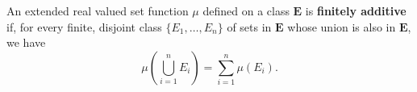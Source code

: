 An extended real valued set function $\mu$ defined on a class $\mathbf{E}$ is \textbf{finitely additive} if, for every finite, disjoint class $\{E_1, \dots, E_n\}$ of sets in $\mathbf{E}$ whose union is also in $\mathbf{E}$, we have
$$\mu\left(\bigcup_{i=1}^{n} E_i\right) = \sum_{i=1}^{n} \mu(E_i).$$
